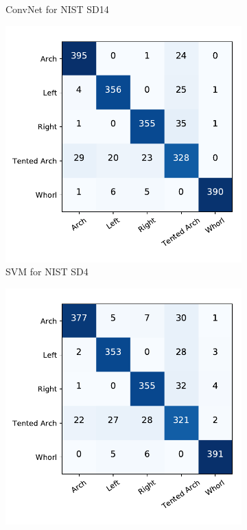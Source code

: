 \begin{figure}[!ht]
\begin{subfigure}[b]{0.25\textwidth}
		\caption{ConvNet for NIST SD14 }
		\label{fig.cnf_matrix_5class.net_sd14}
	\end{subfigure}%
	\begin{subfigure}[b]{0.25\textwidth}
		\centering
		\includegraphics[width=\linewidth]{fig/figs/confusion_matrix_svm_sd4_cross_subject.pdf}
		\caption{SVM for NIST SD4 }
		\label{fig.cnf_matrix_5class.svm_sd4}
	\end{subfigure}%
	\begin{subfigure}[b]{0.25\textwidth}
		\centering
		\includegraphics[width=\linewidth]{fig/figs/confusion_matrix_net_sd4_cross_subject.pdf}

\end{subfigure}
\end{figure}
